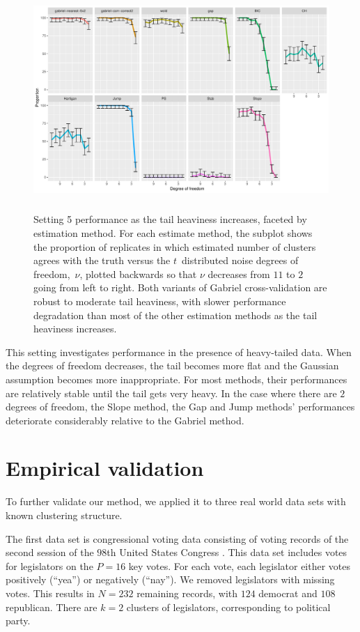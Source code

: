 \documentclass[12pt]{article}
\begin{document}
\begin{figure}[H]
\centering
\includegraphics[width=5.5in, height=3.3in]{main_code/demo/bench/setting5/Facet.pdf}
\caption{Setting 5 performance as the tail heaviness increases,
    faceted by estimation method. For each estimate method, the subplot shows the proportion of
    replicates in which estimated number of clusters agrees with the truth
    versus the $t$~distributed noise degrees of freedom,~$\nu$, plotted
    backwards so that $\nu$ decreases from $11$ to $2$ going from left to
    right. Both variants of Gabriel cross-validation are robust to moderate
    tail heaviness, with slower performance degradation than most of the other
    estimation methods as the tail heaviness increases.}
\label{fig:setting5}
\end{figure}

This setting investigates performance in the presence of heavy-tailed data.
When the degrees of freedom decreases, the tail becomes more flat and the
Gaussian assumption becomes more inappropriate.  For most methods, their
performances are relatively stable until the tail gets very heavy. In the case
where there are $2$ degrees of freedom, the Slope method, the Gap and Jump methods' performances
deteriorate considerably relative to the Gabriel method.


\section{Empirical validation}
\label{sec:empirical-validation}

To further validate our method, we applied it to three real world data sets
with known clustering structure.


The first data set is congressional voting data consisting of voting records
of the second session of the $98$th United States Congress
\citep{schlimmer1987concept}.  This data set includes votes for legislators on
the $P = 16$ key votes.  For each vote, each legislator either votes
positively (``yea'') or negatively (``nay''). We removed legislators with missing
votes.  This results in $N = 232$ remaining records, with $124$ democrat and
$108$ republican. There are $k = 2$ clusters of legislators, corresponding to
political party.
\end{document}
